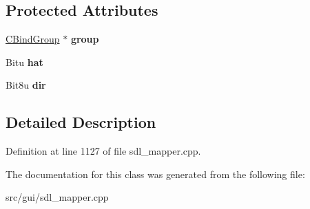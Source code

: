 \subsection*{Protected Attributes}
\begin{DoxyCompactItemize}
\item 
\hypertarget{classCJHatBind_a29b7138a9094d140fad3bb6bef01b3e2}{\hyperlink{classCBindGroup}{C\-Bind\-Group} $\ast$ {\bfseries group}}\label{classCJHatBind_a29b7138a9094d140fad3bb6bef01b3e2}

\item 
\hypertarget{classCJHatBind_a652e1ca02ee3c415917d41bd557a25ba}{Bitu {\bfseries hat}}\label{classCJHatBind_a652e1ca02ee3c415917d41bd557a25ba}

\item 
\hypertarget{classCJHatBind_a2b02bbb8de4fc7bb9941f535254dad19}{Bit8u {\bfseries dir}}\label{classCJHatBind_a2b02bbb8de4fc7bb9941f535254dad19}

\end{DoxyCompactItemize}


\subsection{Detailed Description}


Definition at line 1127 of file sdl\-\_\-mapper.\-cpp.



The documentation for this class was generated from the following file\-:\begin{DoxyCompactItemize}
\item 
src/gui/sdl\-\_\-mapper.\-cpp\end{DoxyCompactItemize}
